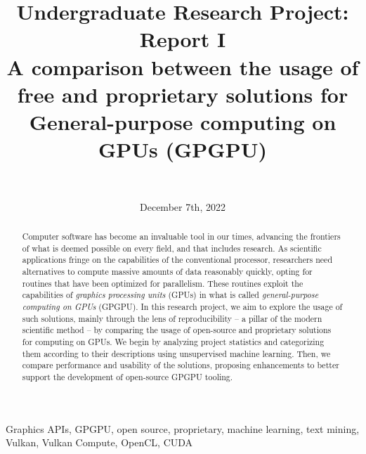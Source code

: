 \documentclass[conference, onecolumn]{IEEEtran}
\begin{document}
\title{\textbf{Undergraduate Research Project: Report I} \\
{A comparison between the usage of free and proprietary solutions for General-purpose computing on GPUs (GPGPU)}
}

\date{December 7th, 2022}

\author{ \\
\and
{}
}

\maketitle

\begin{abstract}
    Computer software has become an invaluable tool in our times, advancing
    the frontiers of what is deemed possible on every field, and that includes
    research.
    As scientific applications fringe on the capabilities of the conventional
    processor, researchers need alternatives to compute massive amounts of data
    reasonably quickly, opting for routines that have been optimized for
    parallelism.
    These routines exploit the capabilities of \textit{graphics processing
    units} (GPUs) in what is called \textit{general-purpose computing on GPUs}
    (GPGPU).
    In this research project, we aim to explore the usage of such solutions,
    mainly through the lens of reproducibility -- a pillar of the modern
    scientific method -- by comparing the usage of open-source and proprietary
    solutions for computing on GPUs.
    We begin by analyzing project statistics and categorizing them according to
    their descriptions using unsupervised machine learning.
    Then, we compare performance and usability of the solutions, proposing
    enhancements to better support the development of open-source GPGPU
    tooling.
\end{abstract}

\begin{IEEEkeywords}
    Graphics APIs, GPGPU, open source, proprietary, machine learning, text
    mining, Vulkan, Vulkan Compute, OpenCL, CUDA
\end{IEEEkeywords}
\end{document}
